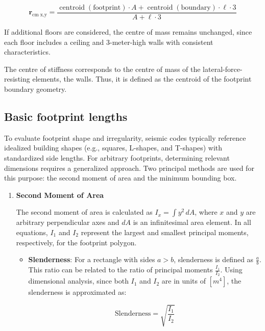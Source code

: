 \begin{refsection}
\begin{equation}
    \label{eq:centroid_avg}
    \mathbf{r}_{\text{cm x,y}} = \frac{\operatorname{centroid}(\text{footprint}) \cdot A + \operatorname{centroid}(\text{boundary}) \cdot \ell \cdot 3}{A + \ell \cdot 3}
\end{equation} 

If additional floors are considered, the centre of mass remains unchanged, since each floor includes a ceiling and 3-meter-high walls with consistent characteristics.

The centre of stiffness corresponds to the centre of mass of the lateral-force-resisting elements, the walls. Thus, it is defined as the centroid of the footprint boundary geometry.

\subsection{Basic footprint lengths}

To evaluate footprint shape and irregularity, seismic codes typically reference idealized building shapes (e.g., squares, L-shapes, and T-shapes) with standardized side lengths. For arbitrary footprints, determining relevant dimensions requires a generalized approach. Two principal methods are used for this purpose: the second moment of area and the minimum bounding box.

\begin{enumerate}
    \item \textbf{Second Moment of Area}

    The second moment of area is calculated as $I_x = \int y^2\,dA$, where $x$ and $y$ are arbitrary perpendicular axes and $dA$ is an infinitesimal area element. In all equations, $I_1$ and $I_2$ represent the largest and smallest principal moments, respectively, for the footprint polygon.

    \begin{itemize}
        \item \textbf{Slenderness}: For a rectangle with sides $a > b$, slenderness is defined as $\frac{a}{b}$. This ratio can be related to the ratio of principal moments $\frac{I_1}{I_2}$. Using dimensional analysis, since both $I_1$ and $I_2$ are in units of $[m^4]$, the slenderness is approximated as:

        \begin{equation}
            \label{eq:slenderness_I}
            \text{Slenderness} = \sqrt{\frac{I_1}{I_2}}
        \end{equation}


\end{itemize}
\end{enumerate}
\end{refsection}
